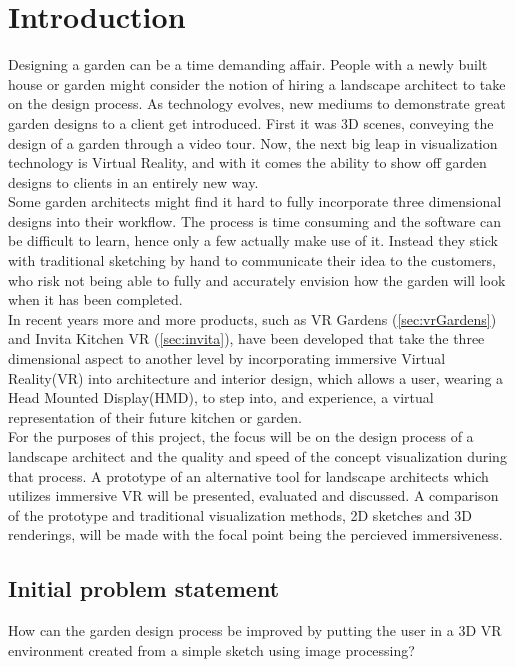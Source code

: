 \chapter{Introduction}
	Designing a garden can be a time demanding affair. People with a newly built house or garden might consider the notion of hiring a landscape architect to take on the design process. As technology evolves, new mediums to demonstrate great garden designs to a client get introduced\cite{landscapeArchitectureDigiTech}. First it was 3D scenes, conveying the design of a garden through a video tour. Now, the next big leap in visualization technology is Virtual Reality\cite{VRS}, and with it comes the ability to show off garden designs to clients in an entirely new way.\\
	
	Some garden architects might find it hard to fully incorporate three dimensional designs into their workflow. The process is time consuming and the software can be difficult to learn, hence only a few actually make use of it. Instead they stick with traditional sketching by hand to communicate their idea to the customers, who risk not being able to fully and accurately envision how the garden will look when it has been completed.\\
	
	In recent years more and more products, such as VR Gardens (\autoref{sec:vrGardens}) and Invita Kitchen VR (\autoref{sec:invita}), have been developed that take the three dimensional aspect to another level by incorporating immersive Virtual Reality(VR) into architecture and interior design, which allows a user, wearing a Head Mounted Display(HMD), to step into, and experience, a virtual representation of their future kitchen or garden.\\
	
	For the purposes of this project, the focus will be on the design process of a landscape architect and the quality and speed of the concept visualization during that process. A prototype of an alternative tool for landscape architects which utilizes immersive VR will be presented, evaluated and discussed. A comparison of the prototype and traditional visualization methods, 2D sketches and 3D renderings, will be made with the focal point being the percieved immersiveness.
	
	
	\section{Initial problem statement}
	How can the garden design process be improved by putting the user in a 3D VR environment created from a simple sketch using image processing?
	